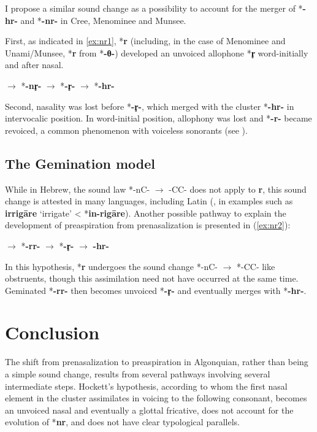 \documentclass[oneside,a4paper,11pt]{article}
\newcommand{\ipa}[1]{{\phon\mbox{\textbf{#1}}}}
\begin{document}
I propose a similar sound change as a possibility to account for the merger of *\ipa{-hr-} and *\ipa{-nr-} in Cree, Menominee and Munsee.

First, as indicated in \ref{ex:nr1}, *\ipa{r} (including, in the case of Menominee and Unami/Munsee, *\ipa{r} from *\ipa{-θ-}) developed an unvoiced allophone *\ipa{r̥} word-initially and after nasal.

\begin{exe}
\ex \label{ex:nr1}
\glt *\ipa{-nr-} $\rightarrow$ *\ipa{-nr̥-} $\rightarrow$ *\ipa{-r̥-} $\rightarrow$ *\ipa{-hr-} 
\end{exe}

Second, nasality was lost before *\ipa{-r̥-}, which merged with the cluster *\ipa{-hr-} in intervocalic position. In word-initial position, allophony was lost and *\ipa{-r-} became revoiced, a common phenomenon with voiceless sonorants (see \citealt{blevins16voiceless.sonorants}).

\subsection{The Gemination model}
While in Hebrew, the sound law *-nC- $\rightarrow$ -CC- does not apply to \ipa{r}, this sound change is attested in many languages, including Latin (\citet[213]{leumann77lateinische}, in examples such as \ipa{irrigāre} `irrigate' < *\ipa{in-rigāre}). Another possible pathway to explain the development of preaspiration from prenasalization is presented in (\ref{ex:nr2}):

\begin{exe}
\ex \label{ex:nr2}
\glt *\ipa{-nr-} $\rightarrow$ *\ipa{-rr-} $\rightarrow$ *\ipa{-r̥-} $\rightarrow$ \ipa{-hr-} 
\end{exe}

In this hypothesis, *\ipa{r} undergoes the sound change *-nC- $\rightarrow$ *-CC- like obstruents, though this assimilation need not have occurred at the same time. Geminated *\ipa{-rr-} then becomes unvoiced *\ipa{-r̥-} and eventually merges with *\ipa{-hr-}.

\section{Conclusion}
The shift from prenasalization to preaspiration in Algonquian, rather than being a simple sound change, results from several pathways involving several intermediate steps. Hockett's hypothesis, according to whom the first nasal element in the cluster assimilates in voicing to the following consonant, becomes an unvoiced nasal and eventually a glottal fricative, does not account for the evolution of *\ipa{nr}, and does not have clear typological parallels.



\end{document}
